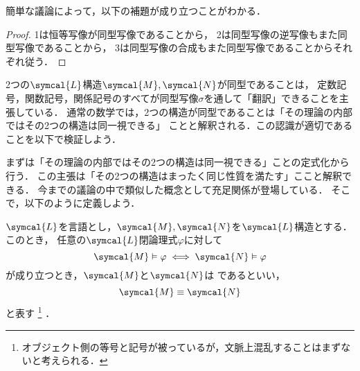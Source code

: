 簡単な議論によって，以下の補題が成り立つことがわかる．


\begin{proof}
	1は恒等写像が同型写像であることから，
	2は同型写像の逆写像もまた同型写像であることから，
	3は同型写像の合成もまた同型写像であることからそれぞれ従う．
\end{proof}

2つの\(\symcal{L}\)構造\(\symcal{M}, \symcal{N}\)が同型であることは，
定数記号，関数記号，関係記号のすべてが同型写像\(\sigma\)を通して「翻訳」できることを主張している．
通常の数学では，2つの構造が同型であることは「その理論の内部ではその2つの構造は同一視できる」
ことと解釈される．この認識が適切であることを以下で検証しよう．

まずは「その理論の内部ではその2つの構造は同一視できる」ことの定式化から行う．
この主張は「その2つの構造はまったく同じ性質を満たす」ここと解釈できる．
今までの議論の中で類似した概念として充足関係が登場している．
そこで，以下のように定義しよう．

\begin{Def} \label{Def:elementarilyequivalent}
	\(\symcal{L}\)を言語とし，\(\symcal{M}, \symcal{N}\)を\(\symcal{L}\)構造とする．
	このとき，
	任意の\(\symcal{L}\)閉論理式\(\varphi\)に対して
	\begin{equation}
		\symcal{M} \satisfy \varphi \metaequivalent \symcal{N} \satisfy \varphi
		\label{eq:elementarilyequivalentcondition}
	\end{equation}
	が成り立つとき，\(\symcal{M}\)と\(\symcal{N}\)は
	であるといい，%
	\begin{equation}
		\symcal{M} \elementarilyequivalent \symcal{N}
		\label{eq:elementarilyequivalent}
	\end{equation}
	と表す%
	\footnote{%
		オブジェクト側の等号と記号が被っているが，文脈上混乱することはまずないと考えられる．
	}%
	．
\end{Def}

